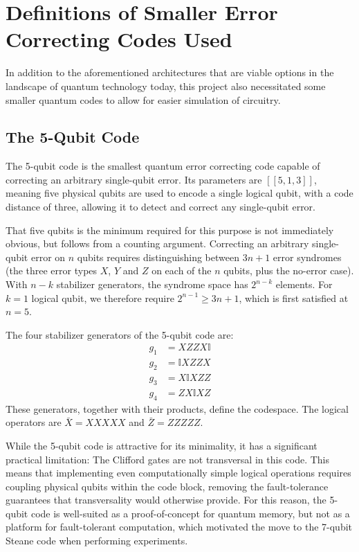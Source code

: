 \chapter{Definitions of Smaller Error Correcting Codes Used}\label{app:smaller_codes}
In addition to the aforementioned architectures that are viable options in the landscape of quantum technology today, this project also necessitated some smaller quantum codes to allow for easier simulation of circuitry.

\section{The 5-Qubit Code}
The 5-qubit code \cite{Nielsen_Chuang_2010} is the smallest quantum error correcting code capable of correcting an arbitrary single-qubit error. Its parameters are $[[5,1,3]]$, meaning five physical qubits are used to encode a single logical qubit, with a code distance of three, allowing it to detect and correct any single-qubit error.

That five qubits is the minimum required for this purpose is not immediately obvious, but follows from a counting argument. Correcting an arbitrary single-qubit error on $n$ qubits requires distinguishing between $3n+1$ error syndromes (the three error types $X$, $Y$ and $Z$ on each of the $n$ qubits, plus the no-error case). With $n - k$ stabilizer generators, the syndrome space has $2^{n-k}$ elements. For $k = 1$ logical qubit, we therefore require $2^{n-1} \geq 3n + 1$, which is first satisfied at $n = 5$.

The four stabilizer generators of the 5-qubit code are:
\begin{align*}
g_1 &= X Z Z X \mathbb{I} \\
g_2 &= \mathbb{I} X Z Z X \\
g_3 &= X \mathbb{I} X Z Z \\
g_4 &= Z X \mathbb{I} X Z
\end{align*}
These generators, together with their products, define the codespace. The logical operators are $\bar{X} = XXXXX$ and $\bar{Z} = ZZZZZ$.

While the 5-qubit code is attractive for its minimality, it has a significant practical limitation: The Clifford gates are not transversal in this code. This means that implementing even computationally simple logical operations requires coupling physical qubits within the code block, removing the fault-tolerance guarantees that transversality would otherwise provide. For this reason, the 5-qubit code is well-suited as a proof-of-concept for quantum memory, but not as a platform for fault-tolerant computation, which motivated the move to the 7-qubit Steane code when performing experiments.

